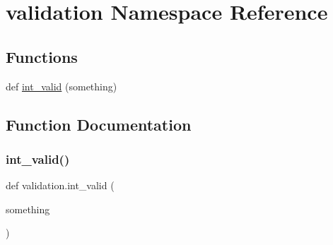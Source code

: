 \hypertarget{namespacevalidation}{}\section{validation Namespace Reference}
\label{namespacevalidation}
\subsection*{Functions}
\begin{DoxyCompactItemize}
\item 
def \hyperlink{namespacevalidation_a92c3d4e20973d5bfaccb5934150887aa}{int\+\_\+valid} (something)
\end{DoxyCompactItemize}


\subsection{Function Documentation}
\mbox{\label{namespacevalidation_a92c3d4e20973d5bfaccb5934150887aa}} 
\subsubsection{\texorpdfstring{int\+\_\+valid()}{int\_valid()}}
{\footnotesize\ttfamily def validation.\+int\+\_\+valid (\begin{DoxyParamCaption}\item[{}]{something }\end{DoxyParamCaption})}

